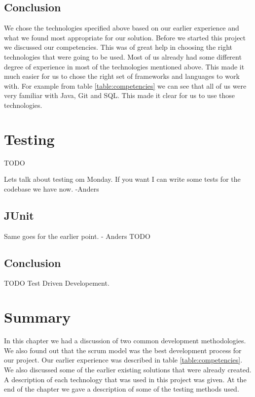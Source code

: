 \subsection{Conclusion}

We chose the technologies specified above based on our earlier experience and what we found most appropriate for our solution.
Before we started this project we discussed our competencies.
This was of great help in choosing the right technologies that were going to be used.
Most of us already had some different degree of experience in most of the technologies mentioned above.
This made it much easier for us to chose the right set of frameworks and languages to work with.
For example from table \ref{table:competencies} we can see that all of us were very familiar with Java, Git and SQL.
This made it clear for us to use those technologies.

\section{Testing}
\label{section:testing}

TODO

Lets talk about testing om Monday. If you want I can write some tests for the codebase we have now. -Anders

\subsection{JUnit}

Same goes for the earlier point. - Anders
TODO

\subsection{Conclusion}

TODO
Test Driven Developement.


\section{Summary}
\label{section:summary}

In this chapter we had a discussion of two common development methodologies.
We also found out that the scrum model was the best development process for our project.
Our earlier experience was described in table \ref{table:competencies}.
We also discussed some of the earlier existing solutions that were already created.
A description of each technology that was used in this project was given. 
At the end of the chapter we gave a description of some of the testing methods used.